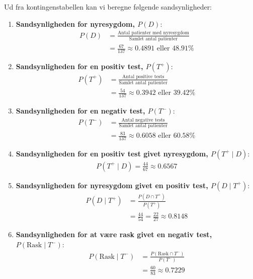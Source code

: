 \begin{solution}
    Ud fra kontingenstabellen kan vi beregne følgende sandsynligheder:

    \begin{enumerate}[label=(\alph*)]
        \item \textbf{Sandsynligheden for nyresygdom, \( P(D) \)}:
        \begin{align*}
        P(D) &= \frac{\text{Antal patienter med nyresygdom}}{\text{Samlet antal patienter}} \\
        &= \frac{67}{137} \approx 0.4891 \text{ eller } 48.91\%
        \end{align*}
        
        \item \textbf{Sandsynligheden for en positiv test, \( P(T^+) \)}:
        \begin{align*}
        P(T^+) &= \frac{\text{Antal positive tests}}{\text{Samlet antal patienter}} \\
        &= \frac{54}{137} \approx 0.3942 \text{ eller } 39.42\%
        \end{align*}
        
        \item \textbf{Sandsynligheden for en negativ test, \( P(T^-) \)}:
        \begin{align*}
        P(T^-) &= \frac{\text{Antal negative tests}}{\text{Samlet antal patienter}} \\
        &= \frac{83}{137} \approx 0.6058 \text{ eller } 60.58\%
        \end{align*}


        \item \textbf{Sandsynligheden for en positiv test givet nyresygdom, \( P(T^+ \mid D) \)}:
        \begin{align*}
            P(T^+ \mid D)=\frac{44}{67} \approx 0.6567
        \end{align*}

        \item \textbf{Sandsynligheden for nyresygdom givet en positiv test, \( P(D \mid T^+) \)}:
        \begin{align*}
        P(D \mid T^+) &= \frac{P(D \cap T^+)}{P(T^+)} \\
        &= \frac{44}{54}=\frac{22}{27} \approx 0.8148
        \end{align*}

        \item \textbf{Sandsynligheden for at være rask givet en negativ test, \( P(\text{Rask} \mid T^-) \)}:
        \begin{align*}
        P(\text{Rask} \mid T^-) &= \frac{P(\text{Rask} \cap T^-)}{P(T^-)} \\
        &= \frac{60}{83} \approx 0.7229
        \end{align*}


\end{enumerate}
\end{solution}
